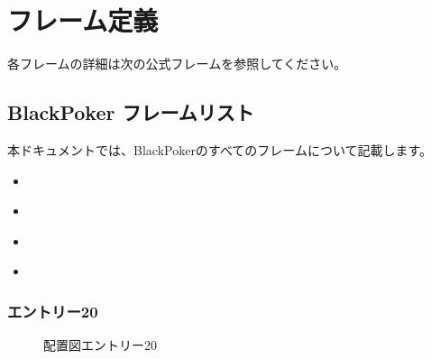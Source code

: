 \documentclass[letterpaper,10pt,dvipdfmx]{sphinxmanual}
\begin{document}
\section{フレーム定義}
\label{\detokenize{frame/frame:id4}}
\sphinxAtStartPar
各フレームの詳細は次の公式フレームを参照してください。

\sphinxstepscope


\subsection{BlackPoker フレームリスト}
\label{\detokenize{auto/framelist:blackpoker}}\label{\detokenize{auto/framelist::doc}}
\sphinxAtStartPar
本ドキュメントでは、BlackPokerのすべてのフレームについて記載します。

\begin{sphinxShadowBox}
\begin{itemize}
\item {} 
\sphinxAtStartPar
{}\label{\detokenize{auto/framelist:id10}}{\hyperref[\detokenize{auto/framelist:frame-entry20}]{}}

\item {} 
\sphinxAtStartPar
{}\label{\detokenize{auto/framelist:id11}}{\hyperref[\detokenize{auto/framelist:frame-pack}]{}}

\item {} 
\sphinxAtStartPar
{}\label{\detokenize{auto/framelist:id12}}{\hyperref[\detokenize{auto/framelist:frame-rarepack}]{}}

\item {} 
\sphinxAtStartPar
{}\label{\detokenize{auto/framelist:id13}}{\hyperref[\detokenize{auto/framelist:frame-rarepackstrategy}]{}}

\end{itemize}
\end{sphinxShadowBox}


\subsubsection{エントリー20}
\label{\detokenize{auto/framelist:frame-entry20}}\label{\detokenize{auto/framelist:id2}}
\sphinxAtStartPar
{}

\begin{figure}[htbp]
\centering
\capstart

\noindent{}
\caption{配置図\sphinxhyphen{}エントリー20}\label{\detokenize{auto/framelist:id6}}\label{\detokenize{auto/framelist:frame-entry20-image}}\end{figure}
\end{document}
